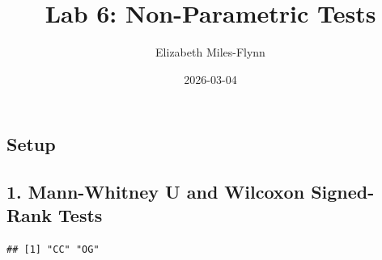 \documentclass[
]{article}
\title{Lab 6: Non-Parametric Tests}
\author{Elizabeth Miles-Flynn}
\date{2026-03-04}
\newenvironment{Shaded}{\begin{snugshade}}{\end{snugshade}}
\newcommand{\FunctionTok}[1]{\textcolor[rgb]{0.13,0.29,0.53}{\textbf{#1}}}
\newcommand{\NormalTok}[1]{#1}
\newcommand{\OtherTok}[1]{\textcolor[rgb]{0.56,0.35,0.01}{#1}}
\newcommand{\SpecialCharTok}[1]{\textcolor[rgb]{0.81,0.36,0.00}{\textbf{#1}}}
\newcommand{\StringTok}[1]{\textcolor[rgb]{0.31,0.60,0.02}{#1}}
\begin{document}
\maketitle

\subsection{Setup}\label{setup}

\subsection{1. Mann-Whitney U and Wilcoxon Signed-Rank
Tests}\label{mann-whitney-u-and-wilcoxon-signed-rank-tests}

\begin{Shaded}
\end{Shaded}

\begin{verbatim}
## [1] "CC" "OG"
\end{verbatim}
\end{document}
